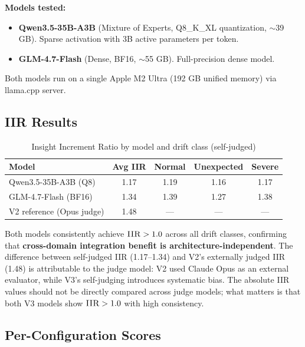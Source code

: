 \documentclass[11pt,a4paper]{article}
\newcommand{\iir}{\textsc{IIR}}
\begin{document}
\textbf{Models tested:}
\begin{itemize}[leftmargin=*,itemsep=2pt]
  \item \textbf{Qwen3.5-35B-A3B} (Mixture of Experts, Q8\_K\_XL quantization,
    $\sim$39 GB). Sparse activation with 3B active parameters per token.
  \item \textbf{GLM-4.7-Flash} (Dense, BF16, $\sim$55 GB). Full-precision
    dense model.
\end{itemize}

Both models run on a single Apple M2 Ultra (192 GB unified memory) via
llama.cpp server.

\subsection{IIR Results}

\begin{table}[H]
\centering
\caption{Insight Increment Ratio by model and drift class (self-judged)}
\label{tab:iir}
\begin{tabular}{lcccc}
\toprule
\textbf{Model} & \textbf{Avg IIR} & \textbf{Normal} & \textbf{Unexpected} & \textbf{Severe} \\
\midrule
Qwen3.5-35B-A3B (Q8) & 1.17 & 1.19 & 1.16 & 1.17 \\
GLM-4.7-Flash (BF16) & 1.34 & 1.39 & 1.27 & 1.38 \\
\midrule
V2 reference (Opus judge) & 1.48 & --- & --- & --- \\
\bottomrule
\end{tabular}
\end{table}

Both models consistently achieve $\iir{} > 1.0$ across all drift classes,
confirming that \textbf{cross-domain integration benefit is
architecture-independent}. The difference between self-judged IIR (1.17--1.34)
and V2's externally judged IIR (1.48) is attributable to the judge model:
V2 used Claude Opus as an external evaluator, while V3's self-judging
introduces systematic bias. The absolute IIR values should not be directly
compared across judge models; what matters is that both V3 models show
$\iir{} > 1.0$ with high consistency.

\subsection{Per-Configuration Scores}
\end{document}
